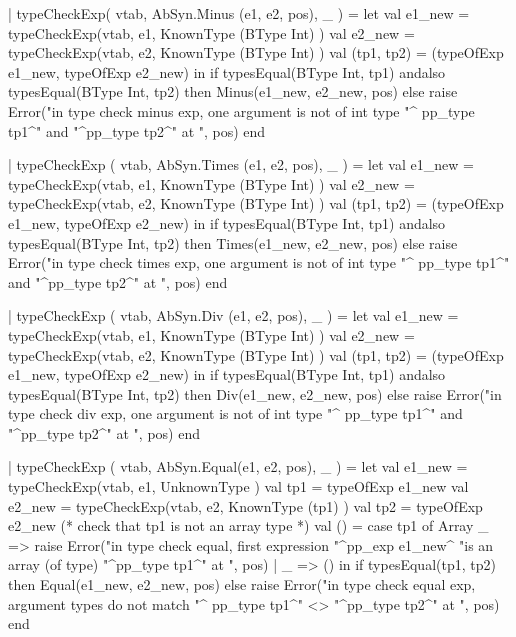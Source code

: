 \documentclass[10pt]{article}
\begin{document}
\begin{fancycode}[frame=lines,fontsize=\scriptsize,label=\textit{edited code - SRC/Type.sml}]
 | typeCheckExp( vtab, AbSyn.Minus (e1, e2, pos), _ ) =
     let val e1_new = typeCheckExp(vtab, e1, KnownType (BType Int) )
         val e2_new = typeCheckExp(vtab, e2, KnownType (BType Int) )
         val (tp1, tp2) = (typeOfExp e1_new, typeOfExp e2_new)
     in  if  typesEqual(BType Int, tp1) andalso typesEqual(BType Int, tp2)
         then Minus(e1_new, e2_new, pos)
         else raise Error("in type check minus exp, one argument is not of int type "^
                          pp_type tp1^" and "^pp_type tp2^" at ", pos)
     end

 | typeCheckExp ( vtab, AbSyn.Times (e1, e2, pos), _ ) =
     let val e1_new = typeCheckExp(vtab, e1, KnownType (BType Int) )
         val e2_new = typeCheckExp(vtab, e2, KnownType (BType Int) )
         val (tp1, tp2) = (typeOfExp e1_new, typeOfExp e2_new)
     in if  typesEqual(BType Int, tp1) andalso typesEqual(BType Int, tp2)
        then Times(e1_new, e2_new, pos)
        else raise Error("in type check times exp, one argument is not of int type "^
                          pp_type tp1^" and "^pp_type tp2^" at ", pos)
     end

 | typeCheckExp ( vtab, AbSyn.Div   (e1, e2, pos), _ ) =
     let val e1_new = typeCheckExp(vtab, e1, KnownType (BType Int) )
         val e2_new = typeCheckExp(vtab, e2, KnownType (BType Int) )
         val (tp1, tp2) = (typeOfExp e1_new, typeOfExp e2_new)
     in if  typesEqual(BType Int, tp1) andalso typesEqual(BType Int, tp2)
        then Div(e1_new, e2_new, pos)
        else raise Error("in type check div exp, one argument is not of int type "^
                          pp_type tp1^" and "^pp_type tp2^" at ", pos)
     end

 | typeCheckExp ( vtab, AbSyn.Equal(e1, e2, pos), _ ) =
    let val e1_new = typeCheckExp(vtab, e1, UnknownType )
         val tp1 = typeOfExp e1_new
         val e2_new = typeCheckExp(vtab, e2, KnownType (tp1) )
         val tp2 = typeOfExp e2_new
         (* check that tp1 is not an array type *)
         val () = case tp1 of
                    Array _ => raise Error("in type check equal, first expression "^pp_exp e1_new^
                                           "is an array (of type) "^pp_type tp1^" at ", pos)
                  | _ => ()
     in  if  typesEqual(tp1, tp2)
         then Equal(e1_new, e2_new, pos)
         else raise Error("in type check equal exp, argument types do not match "^
                          pp_type tp1^" <> "^pp_type tp2^" at ", pos)
     end


\end{fancycode}
\end{document}
